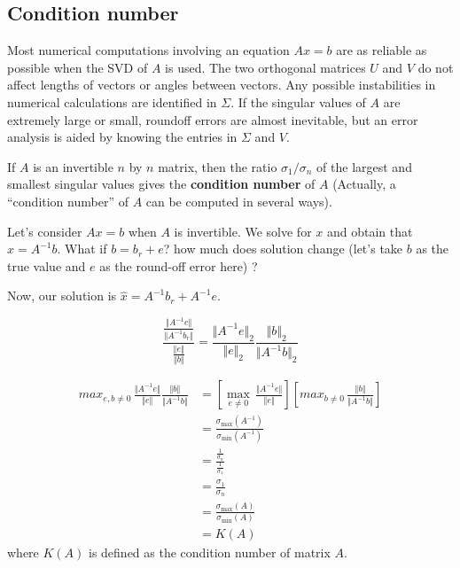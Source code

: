 


\subsection{Condition number}
Most numerical computations involving an equation $Ax = b$ are as reliable as possible when the SVD of $A$ is used. The two
orthogonal matrices $U$ and $V$ do not affect lengths of vectors or angles between vectors. Any possible instabilities in numerical calculations are identified in $\Sigma$. If the singular values of $A$ are extremely large or small, roundoff errors are almost inevitable, but an error analysis is aided by knowing the entries in $\Sigma$ and $V$.

If $A$ is an invertible $n$ by $n$ matrix, then the ratio $\sigma_1/\sigma_n$ of the largest and smallest singular values gives the \textbf{condition number} of $A$ (Actually, a “condition number” of $A$ can be computed in several ways).

Let's consider $Ax = b$ when $A$ is invertible. We solve for $x$ and obtain that $x = A^{-1}b$. What if $b = b_r + e$? how much does solution change (let's take $b$ as the true value and $e$ as the round-off error here) ?

Now, our solution is $\hat{x} = A^{-1}b_r + A^{-1}e$.

\begin{equation*}
\frac{\frac{\Vert A^{-1}e\Vert}{\Vert A^{-1}b_r\Vert}}{\frac{\Vert e\Vert}{\Vert b\Vert}} = \frac{\Vert A^{-1}e\Vert_2}{\Vert e\Vert_2} \frac{\Vert b\Vert_2}{\Vert A^{-1}b\Vert_2}
\end{equation*}

\begin{align*}
max_{e,b\neq 0} \, \frac{\Vert A^{-1}e\Vert}{\Vert e\Vert} \frac{\Vert b\Vert}{\Vert A^{-1}b\Vert} 
&= \left[\max_{e\neq 0}\, \frac{\Vert A^{-1}e\Vert}{\Vert e\Vert}\right]\left[max_{b\neq 0}\, \frac{\Vert b\Vert}{\Vert A^{-1}b\Vert}\right]\\
&= \frac{\sigma_{\max}(A^{-1})}{\sigma_{\min}(A^{-1})}\\
&= \frac{\frac{1}{\sigma_n}}{\frac{1}{\sigma_1}}\\
&= \frac{\sigma_1}{\sigma_n}\\
&= \frac{\sigma_{\max}(A)}{\sigma_{\min}(A)}\\
&= K(A)
\end{align*}
where $K(A)$ is defined as the condition number of matrix $A$.

